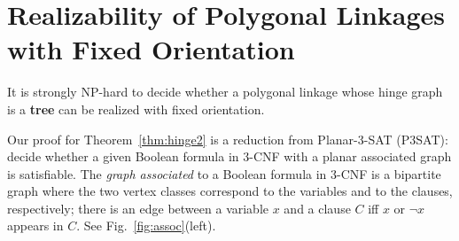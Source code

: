 \documentclass[runningheads]{article}
\begin{document}



\section{Realizability of Polygonal Linkages with Fixed Orientation\label{sec:hinge}}

\begin{theorem}\label{thm:hinge2}
It is strongly NP-hard to decide whether a polygonal linkage whose hinge graph is a \textbf{tree} can be realized with fixed orientation.
\end{theorem}

Our proof for Theorem~\ref{thm:hinge2} is a reduction from {\sc Planar-3-SAT} (P3SAT): decide whether a given Boolean formula in 3-CNF with a planar associated graph is satisfiable. The \emph{graph associated} to a Boolean formula in 3-CNF is a bipartite graph where the two vertex classes correspond to the variables and to the clauses, respectively; there is an edge between a variable $x$ and a clause $C$ iff $x$ or $\neg x$ appears in $C$. See Fig.~\ref{fig:assoc}(left).
%
\end{document}
